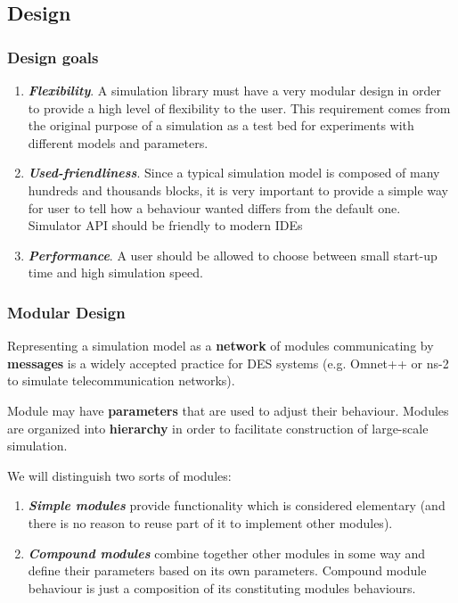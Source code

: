 \documentclass{beamer}
\begin{document}
\subsection{Design}
\begin{frame}
\frametitle{Design goals}
\begin{enumerate}
  \item \textbf{\textit{Flexibility}}. A simulation library must have a very modular design in order to provide a high level of flexibility to the user. This requirement comes from the original purpose of a simulation as a test bed for experiments with different models and parameters.
  \item \textbf{\textit{Used-friendliness}}. Since a typical simulation model is composed of many hundreds and thousands blocks, it is very important to provide a simple way for user to tell how a behaviour wanted differs from the default one. Simulator API should be friendly to modern IDEs
  \item \textbf{\textit{Performance}}. A user should be allowed to choose between small start-up time and high simulation speed.
\end{enumerate}
\end{frame}
\begin{frame}
\frametitle{Modular Design}
Representing a simulation model as a \textbf{network} of modules communicating by \textbf{messages} is a widely accepted practice for DES systems (e.g. Omnet++ or ns-2 to simulate telecommunication networks).

Module may have \textbf{parameters} that are used to adjust their behaviour. Modules are organized into \textbf{hierarchy} in order to facilitate construction of large-scale simulation.

We will distinguish two sorts of modules:
\begin{enumerate}
\item \textbf{\textit{Simple modules}} provide functionality which is considered elementary (and there is no reason to reuse part of it to implement other modules).

\item \textbf{\textit{Compound modules}} combine together other modules in some way and define their parameters based on its own parameters. Compound module behaviour is just a composition of its constituting modules behaviours.
\end{enumerate}
\end{frame}
\end{document}
